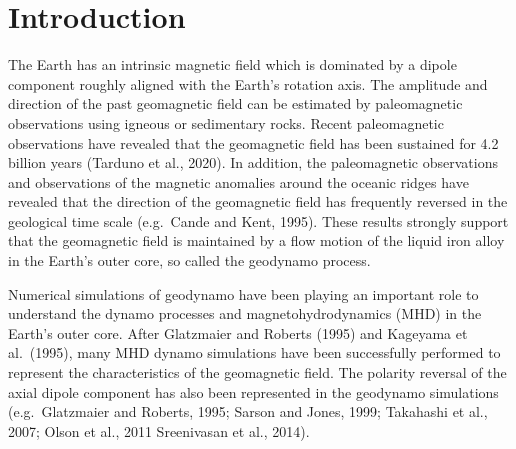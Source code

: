 \newpage
\section{Introduction}
\label{section:introduction}
The Earth has an intrinsic magnetic field which is dominated by a dipole component roughly aligned with the Earth's rotation axis. 
The amplitude and direction of the past geomagnetic field can be estimated by paleomagnetic observations using igneous or sedimentary rocks. Recent paleomagnetic observations have revealed that the geomagnetic field has been sustained for 4.2 billion years (Tarduno et al., 2020). %
In addition, the paleomagnetic observations and observations of the magnetic anomalies around the oceanic ridges have revealed that the direction of the geomagnetic field has frequently reversed in the geological time scale (e.g.\ Cande and Kent, 1995). %
These results strongly support that the geomagnetic field is maintained by a flow motion of the liquid iron alloy in the Earth's outer core, so called the geodynamo process.

Numerical simulations of geodynamo have been playing an important role to understand the dynamo processes and magnetohydrodynamics (MHD) in the Earth's outer core.
After Glatzmaier and Roberts (1995) %
and Kageyama et al.\ (1995), %
many MHD dynamo simulations have been successfully performed to represent the characteristics of the geomagnetic field. 
The polarity reversal of the axial dipole component has also been represented in the geodynamo simulations (e.g.\ Glatzmaier and Roberts, 1995; 
Sarson and Jones, 1999;
Takahashi et al., 2007; 
Olson et al., 2011 
Sreenivasan et al., 2014). %

